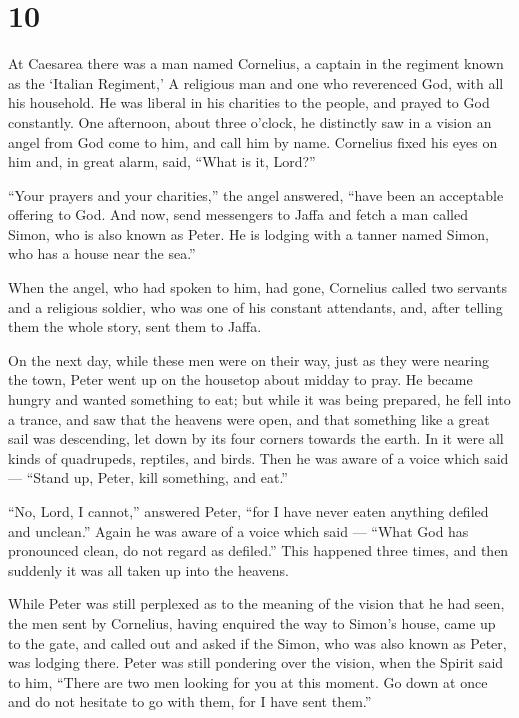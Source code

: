 \hypertarget{section-9}{%
\section{10}\label{section-9}}

 At Caesarea there was a man named Cornelius, a captain in
the regiment known as the `Italian Regiment,'  A religious
man and one who reverenced God, with all his household. He was liberal
in his charities to the people, and prayed to God constantly.
 One afternoon, about three o'clock, he distinctly saw in a
vision an angel from God come to him, and call him by name. 
Cornelius fixed his eyes on him and, in great alarm, said, ``What is it,
Lord?''

``Your prayers and your charities,'' the angel answered, ``have been an
acceptable offering to God.  And now, send messengers to
Jaffa and fetch a man called Simon, who is also known as Peter.
 He is lodging with a tanner named Simon, who has a house
near the sea.''

 When the angel, who had spoken to him, had gone, Cornelius
called two servants and a religious soldier, who was one of his constant
attendants,  and, after telling them the whole story, sent
them to Jaffa.

 On the next day, while these men were on their way, just as
they were nearing the town, Peter went up on the housetop about midday
to pray.  He became hungry and wanted something to eat; but
while it was being prepared, he fell into a trance,  and
saw that the heavens were open, and that something like a great sail was
descending, let down by its four corners towards the earth.
 In it were all kinds of quadrupeds, reptiles, and birds.
 Then he was aware of a voice which said --- ``Stand up,
Peter, kill something, and eat.''

 ``No, Lord, I cannot,'' answered Peter, ``for I have never
eaten anything defiled and unclean.''  Again he was aware
of a voice which said --- ``What God has pronounced clean, do not regard
as defiled.''  This happened three times, and then suddenly
it was all taken up into the heavens.

 While Peter was still perplexed as to the meaning of the
vision that he had seen, the men sent by Cornelius, having enquired the
way to Simon's house, came up to the gate,  and called out
and asked if the Simon, who was also known as Peter, was lodging there.
 Peter was still pondering over the vision, when the Spirit
said to him, ``There are two men looking for you at this moment.
 Go down at once and do not hesitate to go with them, for I
have sent them.''

